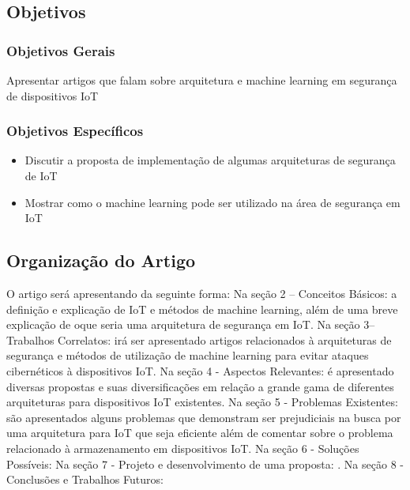 \documentclass[article,12pt]{abntex2}
\begin{document}
\subsection{Objetivos}
\subsubsection{Objetivos Gerais}
Apresentar artigos que falam sobre arquitetura e machine learning em segurança de dispositivos IoT
\subsubsection{Objetivos Específicos}
\begin{itemize}
    \item Discutir a proposta de implementação de algumas arquiteturas de segurança de IoT
    \item Mostrar como o machine learning pode ser utilizado na área de segurança em IoT
\end{itemize}
\subsection{Organização do Artigo}
O artigo será apresentando da seguinte forma: Na seção 2 – Conceitos Básicos: a definição e explicação de IoT e métodos de machine learning, além de uma breve explicação de oque seria uma arquitetura de segurança em IoT. Na seção 3– Trabalhos Correlatos: irá ser apresentado artigos relacionados à arquiteturas de segurança e métodos de utilização de machine learning para evitar ataques cibernéticos à dispositivos IoT. Na seção 4 - Aspectos Relevantes: é apresentado diversas propostas e suas diversificações em relação a grande gama de diferentes arquiteturas para dispositivos IoT existentes. Na seção 5 - Problemas Existentes: são apresentados alguns problemas que demonstram ser prejudiciais na busca por uma arquitetura para IoT que seja eficiente além de comentar sobre o problema relacionado à armazenamento em dispositivos IoT. Na seção 6 - Soluções Possíveis: Na seção 7 - Projeto e desenvolvimento de uma proposta: . Na seção 8 - Conclusões e Trabalhos Futuros:
\end{document}
